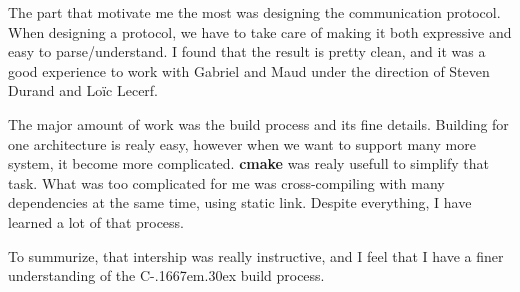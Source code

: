 \documentclass[a4paper,11pt]{custom}
\newcommand{\cmake}{\textbf{cmake}}
\newcommand{\cpp}{%
  C\kern-.1667em\raise.30ex\hbox{\smaller{++}}%
  \spacefactor1000%
}
\begin{document}
The part that motivate me the most was designing the communication protocol.
When designing a protocol, we have to take care of making it both expressive and
easy to parse/understand. I found that the result is pretty clean, and it was a
good experience to work with Gabriel and Maud under the direction of Steven
Durand and Loïc Lecerf.

The major amount of work was the build process and its fine details. Building
for one architecture is realy easy, however when we want to support many more
system, it become more complicated. \cmake{} was realy usefull to simplify that
task. What was too complicated for me was cross-compiling with many dependencies
at the same time, using static link. Despite everything, I have learned a lot of
that process.

To summurize, that intership was really instructive, and I feel that I have a
finer understanding of the \cpp{} build process.
\end{document}
